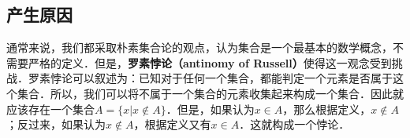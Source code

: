 \begin{issues}
\issueTODO
\end{issues}


\subsection{产生原因}
通常来说，我们都采取朴素集合论的观点，认为集合是一个最基本的数学概念，不需要严格的定义．但是，\textbf{罗素悖论（antinomy of Russell）}使得这一观念受到挑战．罗素悖论可以叙述为：已知对于任何一个集合，都能判定一个元素是否属于这个集合．所以，我们可以将不属于一个集合的元素收集起来构成一个集合．因此就应该存在一个集合$A=\{x|x\notin A\}$．但是，如果认为$x\in A$，那么根据定义，$x\notin A$；反过来，如果认为$x\notin A$，根据定义又有$x\in A$．这就构成一个悖论．

